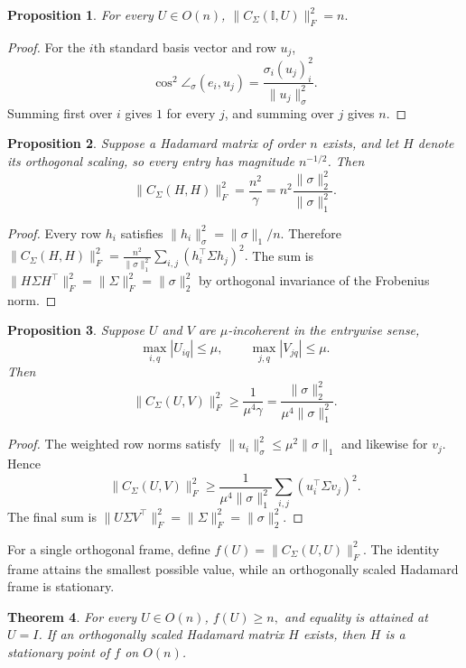 \documentclass[11pt, preprint]{article}
\newtheorem{theorem}{Theorem}[section]
\newtheorem{prop}[theorem]{Proposition}
\begin{document}
\begin{prop} \label{prop:cos-identity-frame}
For every $U\in O(n)$,
\(
\|C_\Sigma(\mathbb{I},U)\|_F^2=n.
\)
\end{prop}

\begin{proof}
For the $i$th standard basis vector and row $u_j$,
\[
\cos^2\angle_\sigma(e_i,u_j)
=
\frac{\sigma_i(u_j)_i^2}{\|u_j\|_\sigma^2}.
\]
Summing first over $i$ gives $1$ for every $j$, and summing over $j$ gives $n$.
\end{proof}

\begin{prop} \label{prop:avg_cos_hadamard}
Suppose a Hadamard matrix of order $n$ exists, and let $H$ denote its orthogonal scaling, so every entry has magnitude $n^{-1/2}$. Then
\[
\|C_\Sigma(H,H)\|_F^2
=
\frac{n^2}{\gamma}
=
n^2\frac{\|\sigma\|_2^2}{\|\sigma\|_1^2}.
\]
\end{prop}

\begin{proof}
Every row $h_i$ satisfies
$\|h_i\|_\sigma^2=\|\sigma\|_1/n$. Therefore
\(
\|C_\Sigma(H,H)\|_F^2
=
\frac{n^2}{\|\sigma\|_1^2}
\sum_{i,j}(h_i^\top\Sigma h_j)^2.
\)
The sum is $\|H\Sigma H^\top\|_F^2=\|\Sigma\|_F^2=\|\sigma\|_2^2$ by orthogonal invariance of the Frobenius norm.
\end{proof}

\begin{prop}\label{prop:avg_cos_incoh}
Suppose $U$ and $V$ are $\mu$-incoherent in the entrywise sense,
\[
\max_{i,q}|U_{iq}|\leq\mu,
\qquad
\max_{j,q}|V_{jq}|\leq\mu.
\]
Then
\[
\|C_\Sigma(U,V)\|_F^2
\geq
\frac{1}{\mu^4\gamma}
=
\frac{\|\sigma\|_2^2}{\mu^4\|\sigma\|_1^2}.
\]
\end{prop}

\begin{proof}
The weighted row norms satisfy
$\|u_i\|_\sigma^2\leq\mu^2\|\sigma\|_1$ and likewise for $v_j$. Hence
\[
\|C_\Sigma(U,V)\|_F^2
\geq
\frac{1}{\mu^4\|\sigma\|_1^2}
\sum_{i,j}(u_i^\top\Sigma v_j)^2.
\]
The final sum is
$\|U\Sigma V^\top\|_F^2=\|\Sigma\|_F^2=\|\sigma\|_2^2$.
\end{proof}

For a single orthogonal frame, define
\(
f(U)=\|C_\Sigma(U,U)\|_F^2.
\)
The identity frame attains the smallest possible value, while an orthogonally scaled Hadamard frame is stationary.

\begin{theorem}\label{thm:min_max_weighted_cos_sym}
For every $U\in O(n)$,
\(
f(U)\geq n,
\)
and equality is attained at $U=I$. If an orthogonally scaled Hadamard matrix $H$ exists, then $H$ is a stationary point of $f$ on $O(n)$.
\end{theorem}
\end{document}
